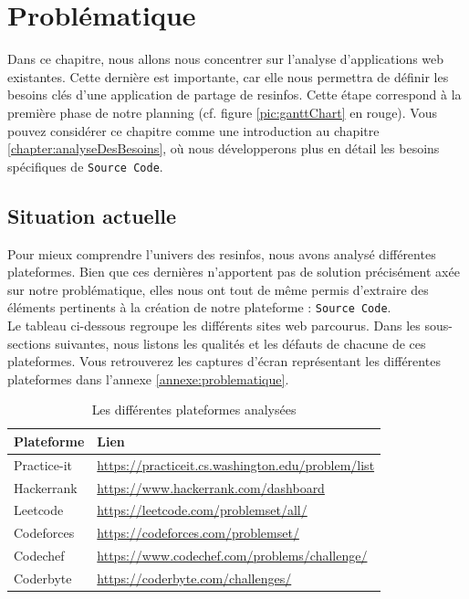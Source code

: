 \chapter{Problématique}
\label{chapter:problematique}

Dans ce chapitre, nous allons nous concentrer sur l'analyse d'applications web existantes. Cette dernière est importante, car elle nous permettra de définir les besoins clés d'une application de partage de \glspl{resinfo}. Cette étape correspond à la première phase de notre planning (cf. figure \ref{pic:ganttChart} en rouge). Vous pouvez considérer ce chapitre comme une introduction au chapitre \ref{chapter:analyseDesBesoins}, où nous développerons plus en détail les besoins spécifiques de \texttt{Source Code}.

\section{Situation actuelle}
\label{section:situation}

Pour mieux comprendre l'univers des \glspl{resinfo}, nous avons analysé différentes plateformes. Bien que ces dernières n'apportent pas de solution précisément axée sur notre problématique, elles nous ont tout de même permis d'extraire des éléments pertinents à la création de notre plateforme : \texttt{Source Code}.\\

Le tableau ci-dessous regroupe les différents sites web parcourus. Dans les sous-sections suivantes, nous listons les qualités et les défauts de chacune de ces plateformes. Vous retrouverez les captures d'écran représentant les différentes plateformes dans l'annexe \ref{annexe:problematique}.\\

\begin{table}[H]
    \centering
    \begin{tabular}{| l | l |}
    \hline
        Plateforme & Lien \\
    \hline
        Practice-it &
        \href{https://practiceit.cs.washington.edu/problem/list}{https://practiceit.cs.washington.edu/problem/list} \\ 
    \hline
        Hackerrank &
        \href{https://www.hackerrank.com/dashboard}{https://www.hackerrank.com/dashboard} \\ 
    \hline
        Leetcode &
        \href{https://leetcode.com/problemset/all/}{https://leetcode.com/problemset/all/} \\ 
    \hline
        Codeforces &
        \href{https://codeforces.com/problemset/}{https://codeforces.com/problemset/} \\ 
    \hline
        Codechef &
        \href{https://www.codechef.com/problems/challenge/}{https://www.codechef.com/problems/challenge/} \\ 
    \hline
        Coderbyte &
        \href{https://coderbyte.com/challenges/}{https://coderbyte.com/challenges/} \\ 
    \hline
    \end{tabular}
    \caption{Les différentes plateformes analysées}
    \label{table:compPlateforme}
\end{table}

